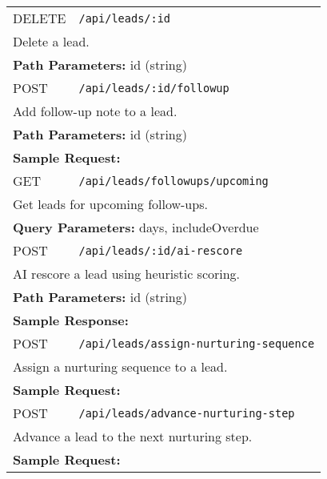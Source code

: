 \documentclass[11pt,a4paper]{article}
\begin{document}
\begin{longtable}{p{2.5cm}p{10cm}}
DELETE & \texttt{/api/leads/:id} \\
\multicolumn{2}{p{13cm}}{Delete a lead.} \\
\multicolumn{2}{p{13cm}}{\textbf{Path Parameters:} id (string)} \\
POST & \texttt{/api/leads/:id/followup} \\
\multicolumn{2}{p{13cm}}{Add follow-up note to a lead.} \\
\multicolumn{2}{p{13cm}}{\textbf{Path Parameters:} id (string)} \\
\multicolumn{2}{p{13cm}}{\textbf{Sample Request:}}
\begin{lstlisting}[language=json]
{"note":"Called the lead","nextFollowUpAt":"2025-01-20T10:00:00Z"}
\end{lstlisting} \\
GET & \texttt{/api/leads/followups/upcoming} \\
\multicolumn{2}{p{13cm}}{Get leads for upcoming follow-ups.} \\
\multicolumn{2}{p{13cm}}{\textbf{Query Parameters:} days, includeOverdue} \\
POST & \texttt{/api/leads/:id/ai-rescore} \\
\multicolumn{2}{p{13cm}}{AI rescore a lead using heuristic scoring.} \\
\multicolumn{2}{p{13cm}}{\textbf{Path Parameters:} id (string)} \\
\multicolumn{2}{p{13cm}}{\textbf{Sample Response:}}
\begin{lstlisting}[language=json]
{"success": true, "data": {"leadId": "64f1a2b3c4d5e6f7a8b9c0d3", "score": 60, "explanation": ["Hot lead temperature: +30", "Lead source present: +5"]}}
\end{lstlisting} \\
POST & \texttt{/api/leads/assign-nurturing-sequence} \\
\multicolumn{2}{p{13cm}}{Assign a nurturing sequence to a lead.} \\
\multicolumn{2}{p{13cm}}{\textbf{Sample Request:}}
\begin{lstlisting}[language=json]
{"leadId":"64f1a2b3c4d5e6f7a8b9c0d3","sequenceId":"65a1b2c3d4e5f6a7b8c9d0e1"}
\end{lstlisting} \\
POST & \texttt{/api/leads/advance-nurturing-step} \\
\multicolumn{2}{p{13cm}}{Advance a lead to the next nurturing step.} \\
\multicolumn{2}{p{13cm}}{\textbf{Sample Request:}
}
\end{longtable}
\end{document}
